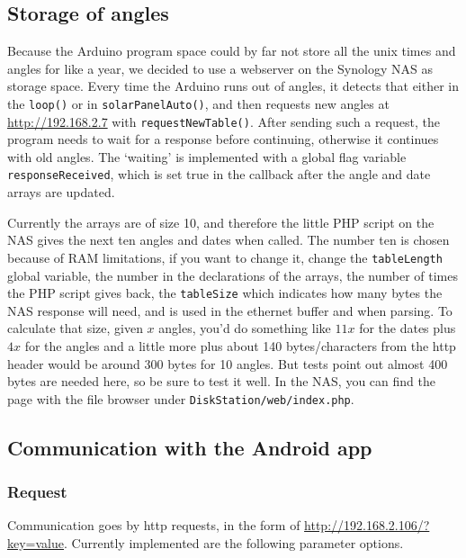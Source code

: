 \subsection{Storage of angles}\label{subsec:storageOfAngles}
    Because the Arduino program space could by far not store all the unix times and angles for like a year, we decided to use a webserver on the Synology NAS as storage space.
    Every time the Arduino runs out of angles, it detects that either in the \verb|loop()| or in \verb|solarPanelAuto()|, and then requests new angles at \url{http://192.168.2.7} with \verb|requestNewTable()|. After sending such a request, the program needs to wait for a response before continuing, otherwise it continues with old angles.
    The `waiting' is implemented with a global flag variable \verb|responseReceived|, which is set true in the callback after the angle and date arrays are updated.

    Currently the arrays are of size 10, and therefore the little PHP script on the NAS gives the next ten angles and dates when called.
    The number ten is chosen because of RAM limitations, if you want to change it, change the \verb|tableLength| global variable, the number in the declarations of the arrays, the number of times the PHP script gives back, the \verb|tableSize| which indicates how many bytes the NAS response will need, and is used in the ethernet buffer and when parsing.
    To calculate that size, given $x$ angles, you'd do something like $11x$ for the dates plus $4x$ for the angles and a little more plus about 140 bytes/characters from the http header would be around 300 bytes for 10 angles.
    But tests point out almost 400 bytes are needed here, so be sure to test it well.
    In the NAS, you can find the page with the file browser under \verb|DiskStation/web/index.php|.

\newcommand{\ipaddress}{http://192.168.8.42} %

\subsection{Communication with the Android app} \label{subsec:arduinotoandroid}
    \subsubsection{Request}
    Communication goes by http requests, in the form of \url{http://192.168.2.106/?key=value}.
    Currently implemented are the following parameter options.

